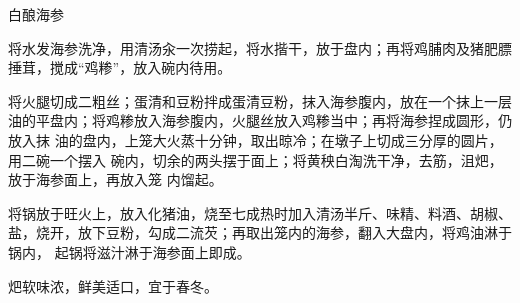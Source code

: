 \begin{recipe}[金钱海参]{白酿海参}

\ingredients


\preparation

\step 将水发海参洗净，用清汤汆一次捞起，将水揩干，放于盘内；再将鸡脯肉及猪肥膘
捶茸，搅成“鸡糁”，放入碗内待用。

\step 将火腿切成二粗丝；蛋清和豆粉拌成蛋清豆粉，抹入海参腹内，放在一个抹上一层
油的平盘内；将鸡糁放入海参腹内，火腿丝放入鸡糁当中；再将海参捏成圆形，仍放入抹
油的盘内，上笼大火蒸十分钟，取出晾冷；在墩子上切成三分厚的圆片，用二碗一个摆入
碗内，切余的两头摆于面上；将黄秧白淘洗干净，去筋，沮𤆵，放于海参面上，再放入笼
内馏起。

\step 将锅放于旺火上，放入化猪油，烧至七成热时加入清汤半斤、味精、料酒、胡椒、
盐，烧开，放下豆粉，勾成二流芡；再取出笼内的海参，翻入大盘内，将鸡油淋于锅内，
起锅将滋汁淋于海参面上即成。

\features

𤆵软味浓，鲜美适口，宜于春冬。

\end{recipe}

